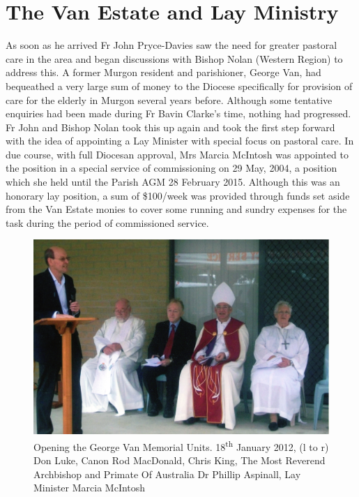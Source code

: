 \section{The Van Estate and Lay Ministry}



As soon as he arrived Fr John Pryce-Davies saw the need for greater pastoral care in the area and began discussions with Bishop Nolan (Western Region) to address this. A former Murgon resident and parishioner, George Van, had bequeathed a very large sum of money to the Diocese specifically for provision of care for the elderly in Murgon several years before. Although some tentative enquiries had been made during Fr Bavin Clarke's time, nothing had progressed. Fr John and Bishop Nolan took this up again and took the first step forward with the idea of appointing a Lay Minister with special focus on pastoral care. In due course, with full Diocesan approval, Mrs Marcia McIntosh was appointed to the position in a special service of commissioning on 29 May, 2004, a position which she held until the Parish AGM 28 February 2015. Although this was an honorary lay position, a sum of \$100/week was provided through funds set aside from the Van Estate monies to cover some running and sundry expenses for the task during the period of commissioned service.









\begin{figure}[!htb]
\begin{center}
\includegraphics[width=1.\textwidth,center]{../images/openingGeorgeVannMemorialUnits.jpg}
\caption{Opening the George Van Memorial Units. 18\textsuperscript{th} January 2012, (l to r) Don Luke, Canon Rod MacDonald, Chris King, The Most Reverend Archbishop and Primate Of Australia Dr Phillip Aspinall, Lay Minister Marcia McIntosh}
\end{center}
\end{figure}




